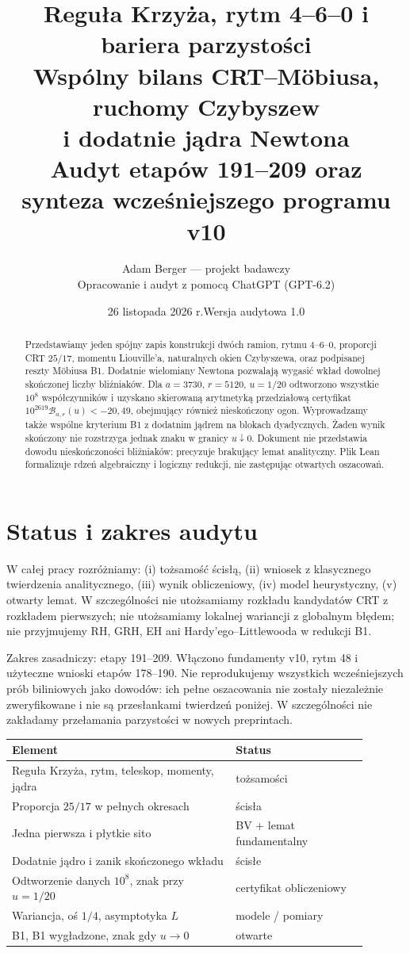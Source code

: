 \documentclass[11pt,a4paper]{article}
\title{\textbf{Reguła Krzyża, rytm 4--6--0 i bariera parzystości}\\[4pt]\large Wspólny bilans CRT--Möbiusa, ruchomy Czybyszew\\i dodatnie jądra Newtona\\\normalsize Audyt etapów 191--209 oraz synteza wcześniejszego programu v10}
\author{Adam Berger --- projekt badawczy\\\small Opracowanie i audyt z pomocą ChatGPT (GPT-6.2)}
\date{26 listopada 2026 r.\quad Wersja audytowa 1.0}
\theoremstyle{definition}\newtheorem{defn}[tw]{Definicja}
\theoremstyle{remark}\newtheorem*{uw}{Uwaga}
\newcommand{\B}{\mathcal B}
\begin{document}
\maketitle
\begin{abstract}
Przedstawiamy jeden spójny zapis konstrukcji dwóch ramion, rytmu 4--6--0,
proporcji CRT $25/17$, momentu Liouville'a, naturalnych okien Czybyszewa,
oraz podpisanej reszty Möbiusa B1. Dodatnie wielomiany Newtona pozwalają
wygasić wkład dowolnej skończonej liczby bliźniaków. Dla $a=3730$, $r=5120$,
$u=1/20$ odtworzono wszystkie $10^8$ współczynników i uzyskano skierowaną
arytmetyką przedziałową certyfikat $10^{2619}\B_{a,r}(u)<-20{,}49$, obejmujący
również nieskończony ogon. Wyprowadzamy także wspólne kryterium B1 z dodatnim
jądrem na blokach dyadycznych. Żaden wynik skończony nie rozstrzyga jednak
znaku w granicy $u\downarrow0$. Dokument nie przedstawia dowodu nieskończoności
bliźniaków: precyzuje brakujący lemat analityczny. Plik Lean formalizuje
rdzeń algebraiczny i logiczny redukcji, nie zastępując otwartych oszacowań.
\end{abstract}
\clearpage
\tableofcontents
\clearpage
\section{Status i zakres audytu}
W całej pracy rozróżniamy: (i) tożsamość ścisłą, (ii) wniosek z klasycznego
twierdzenia analitycznego, (iii) wynik obliczeniowy, (iv) model heurystyczny,
(v) otwarty lemat. W szczególności nie utożsamiamy rozkładu kandydatów CRT z
rozkładem pierwszych; nie utożsamiamy lokalnej wariancji z globalnym błędem;
nie przyjmujemy RH, GRH, EH ani Hardy'ego--Littlewooda w redukcji B1.

Zakres zasadniczy: etapy 191--209. Włączono fundamenty v10, rytm 48 i użyteczne
wnioski etapów 178--190. Nie reprodukujemy wszystkich wcześniejszych prób
biliniowych jako dowodów: ich pełne oszacowania nie zostały niezależnie
zweryfikowane i nie są przesłankami twierdzeń poniżej. W szczególności nie
zakładamy przełamania parzystości w nowych preprintach.

\begin{center}
\begin{tabular}{p{0.56\linewidth}p{0.33\linewidth}}
\toprule
Element & Status\\\midrule
Reguła Krzyża, rytm, teleskop, momenty, jądra & tożsamości\\
Proporcja $25/17$ w pełnych okresach & ścisła\\
Jedna pierwsza i płytkie sito & BV + lemat fundamentalny\\
Dodatnie jądro i zanik skończonego wkładu & ścisłe\\
Odtworzenie danych $10^8$, znak przy $u=1/20$ & certyfikat obliczeniowy\\
Wariancja, oś $1/4$, asymptotyka $L$ & modele / pomiary\\
B1, B1 wygładzone, znak gdy $u\to0$ & otwarte\\\bottomrule
\end{tabular}
\end{center}
\end{document}
